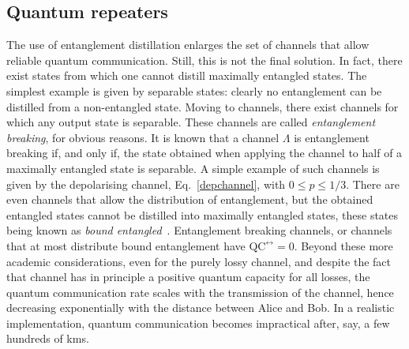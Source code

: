 \documentclass[a4paper]{article}
\begin{document}
\subsection{Quantum repeaters}

The use of entanglement distillation enlarges the set of channels that allow reliable quantum communication. Still, this is not the final solution. In fact, there exist states from which one cannot distill maximally entangled states. The simplest example is given by separable states: clearly no entanglement can be distilled from a non-entangled state. Moving to channels, there exist channels for which any output state is separable. These channels are called \emph{entanglement breaking}, for obvious reasons. It is known that a channel $\Lambda$ is entanglement breaking if, and only if, the state obtained when applying the channel to half of a maximally entangled state is separable. A simple example of such channels is given by the depolarising channel, Eq.~\eqref{depchannel}, with $0\leq p\leq 1/3$. There are even channels that allow the distribution of entanglement, but the obtained entangled states cannot be distilled into maximally entangled states, these states being known as \emph{bound entangled}~\cite{horodecki}. Entanglement breaking channels, or channels that at most distribute bound entanglement have $\text{QC}^\leftrightarrow=0$. Beyond these more academic considerations, even for the purely lossy channel, and despite the fact that channel has in principle a positive quantum capacity for all losses, the quantum communication rate scales with the transmission of the channel, hence decreasing exponentially with the distance between Alice and Bob. In a realistic implementation, quantum communication becomes impractical after, say, a few hundreds of kms.
\end{document}
